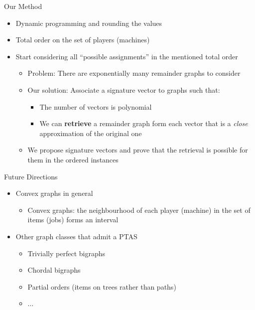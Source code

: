 \begin{frame}[t]{Our Method}
    \begin{itemize}
        \item<2-> Dynamic programming and rounding the values 
        \item<3-> Total order on the set of players (machines)
        \item<4-> Start considering all ``possible assignments'' in the mentioned total order
            \begin{itemize}
                \item<5-> Problem: There are exponentially many \alert{remainder} graphs to consider
                \item<6-> Our solution: Associate a signature vector to graphs such that:
                    \begin{itemize}
                        \item<7-> The number of vectors is polynomial
                        \item<8-> We can \textbf{retrieve} a remainder graph form each vector that is a \emph{close} approximation of the original one
                    \end{itemize}
                \item<9-> We \alert{propose} signature vectors and \alert{prove} that the retrieval is possible for them in the ordered instances
            \end{itemize}
    \end{itemize}
\end{frame}

\begin{frame}[t]{Future Directions}

	\begin{itemize}
    	\item<1-> Convex graphs in general 
    	    \begin{itemize}
    	        \item<2-> Convex graphs: the neighbourhood of each player (machine) in the set of items (jobs) forms an interval
    	    \end{itemize}
        \item<3-> Other graph classes that admit a PTAS
        	\begin{itemize}
            	\item<4-> Trivially perfect bigraphs
                \item<5-> Chordal bigraphs
                \item<6-> Partial orders (items on trees rather than paths)
                \item<7-> $\ldots$
            \end{itemize}
    \end{itemize}
\end{frame}

